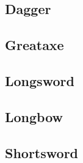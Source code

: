 \subsection{Dagger}\label{skill:dagger}

\subsection{Greataxe}\label{skill:greataxe}

\subsection{Longsword}\label{skill:longsword}

\subsection{Longbow}\label{skill:longbow}

\subsection{Shortsword}\label{skill:shortsword}
